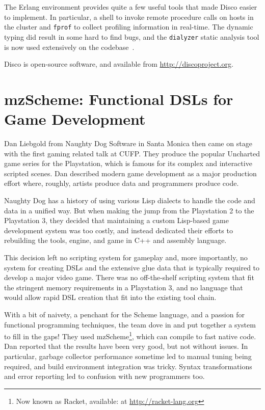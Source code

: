 \documentclass{jfp1}
\begin{document}
The Erlang environment provides quite a few useful tools that made Disco easier
to implement. In particular, a shell to invoke remote procedure calls on hosts
in the cluster and {\tt fprof} to collect profiling information in real-time.
The dynamic typing did result in some hard to find bugs, and the {\tt dialyzer}
static analysis tool is now used extensively on the codebase~\cite{Sagonas:2007:DDE:1273920.1273926}.

Disco is open-source software, and available from \url{http://discoproject.org}.

\section{mzScheme: Functional DSLs for Game Development}

Dan Liebgold from Naughty Dog Software in Santa Monica then came on stage with
the first gaming related talk at CUFP. They produce the popular Uncharted game
series for the Playstation, which is famous for its complex and interactive
scripted scenes.  Dan described modern game development as a major production
effort where, roughly, artists produce data and programmers produce code.

Naughty Dog has a history of using various Lisp dialects to handle the code and
data in a unified way. But when making the jump from the Playstation 2 to the
Playstation 3, they decided that maintaining a custom Lisp-based game
development system was too costly, and instead dedicated their efforts to
rebuilding the tools, engine, and game in C++ and assembly language.

This decision left no scripting system for gameplay and, more importantly, no
system for creating DSLs and the extensive glue data that is typically required
to develop a major video game. There was no off-the-shelf scripting system that
fit the stringent memory requirements in a Playstation 3, and no language that
would allow rapid DSL creation that fit into the existing tool chain.

With a bit of naivety, a penchant for the Scheme language, and a passion for
functional programming techniques, the team dove in and put together a system
to fill in the gaps!  They used mzScheme\footnote{Now known as Racket,
available: at \url{http://racket-lang.org}}, which can compile to fast native
code. Dan reported that the results have been very good, but not without
issues.  In particular, garbage collector performance sometime led to manual
tuning being required, and build environment integration was tricky.  Syntax
transformations and error reporting led to confusion with new programmers too.
\end{document}
